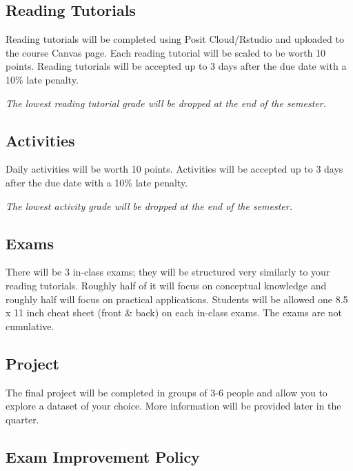 \documentclass[
  letterpaper,
  DIV=11,
  numbers=noendperiod]{scrreprt}
\begin{document}
\hypertarget{reading-tutorials}{%
\subsection*{Reading Tutorials}\label{reading-tutorials}}

Reading tutorials will be completed using Posit Cloud/Rstudio and
uploaded to the course Canvas page. Each reading tutorial will be scaled
to be worth 10 points. Reading tutorials will be accepted up to 3 days
after the due date with a 10\% late penalty.

\emph{The lowest reading tutorial grade will be dropped at the end of
the semester.}

\hypertarget{activities}{%
\subsection*{Activities}\label{activities}}

Daily activities will be worth 10 points. Activities will be accepted up
to 3 days after the due date with a 10\% late penalty.

\emph{The lowest activity grade will be dropped at the end of the
semester.}

\hypertarget{exams}{%
\subsection*{Exams}\label{exams}}

There will be 3 in-class exams; they will be structured very similarly
to your reading tutorials. Roughly half of it will focus on conceptual
knowledge and roughly half will focus on practical applications.
Students will be allowed one 8.5 x 11 inch cheat sheet (front \& back)
on each in-class exams. The exams are not cumulative.

\hypertarget{project}{%
\subsection*{Project}\label{project}}

The final project will be completed in groups of 3-6 people and allow
you to explore a dataset of your choice. More information will be
provided later in the quarter.

\hypertarget{exam-improvement-policy}{%
\subsection*{Exam Improvement Policy}\label{exam-improvement-policy}}
\end{document}
